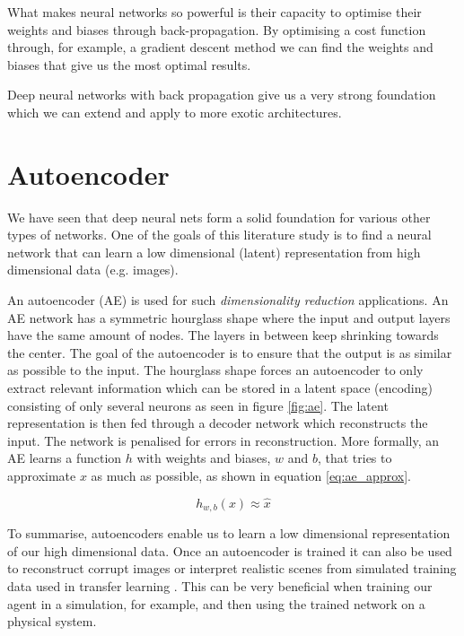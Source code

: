 \documentclass[main.tex]{subfiles}
\begin{document}
What makes neural networks so powerful is their capacity to optimise their weights and biases through back-propagation. By optimising a cost function through, for example, a gradient descent method we can find the weights and biases that give us the most optimal results.

Deep neural networks with back propagation give us a very strong foundation which we can extend and apply to more exotic architectures.


\section{Autoencoder}
We have seen that deep neural nets form a solid foundation for various other types of networks. One of the goals of this literature study is to find a neural network that can learn a low dimensional (latent) representation from high dimensional data (e.g. images).

An autoencoder (AE) is used for such \textit{dimensionality reduction} applications. An AE network has a symmetric hourglass shape where the input and output layers have the same amount of nodes. The layers in between keep shrinking towards the center. The goal of the autoencoder is to ensure that the output is as similar as possible to the input. The hourglass shape forces an autoencoder to only extract relevant information which can be stored in a latent space (encoding) consisting of only several neurons as seen in figure \ref{fig:ae}. The latent representation is then fed through a decoder network which reconstructs the input. The network is penalised for errors in reconstruction. More formally, an AE learns a function $h$ with weights and biases, $w$ and $b$, that tries to approximate $x$ as much as possible, as shown in equation \eqref{eq:ae_approx}.

\begin{equation}
\label{eq:ae_approx}
  h_{w,b}(x) \approx \hat{x}
\end{equation}


To summarise, autoencoders enable us to learn a low dimensional representation of our high dimensional data. Once an autoencoder is trained it can also be used to reconstruct corrupt images or interpret realistic scenes from simulated training data used in transfer learning \cite{zhuang2015supervised,kandaswamy2014improving}. This can be very beneficial when training our agent in a simulation, for example, and then using the trained network on a physical system.
\end{document}
